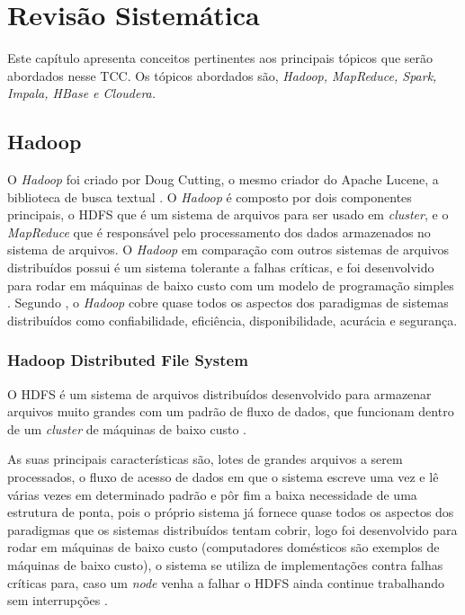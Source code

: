\chapter[Revisão Sistemática]{Revisão Sistemática}

    Este capítulo apresenta conceitos pertinentes aos principais tópicos que serão abordados
    nesse TCC. Os tópicos abordados são, \textit{Hadoop, MapReduce, Spark, Impala, HBase e
    Cloudera.}

    \section{Hadoop}

            O \textit{Hadoop} foi criado por Doug Cutting, o mesmo criador do Apache Lucene, a biblioteca de busca
            textual \cite{white2015}. O \textit{Hadoop} é composto por dois componentes principais, o HDFS que é
            um sistema de arquivos para ser usado em \textit{cluster}, e o \textit{MapReduce} que é responsável
            pelo processamento dos dados armazenados no sistema de arquivos. O \textit{Hadoop} em comparação
            com outros sistemas de arquivos distribuídos possui é um sistema tolerante a falhas críticas, e foi
            desenvolvido para rodar em máquinas de baixo custo com um modelo de programação simples
            \cite{alam2014}. Segundo , o \textit{Hadoop} cobre quase todos os aspectos dos
            paradigmas de sistemas distribuídos como confiabilidade, eficiência, disponibilidade, acurácia e segurança.

        \subsection{Hadoop Distributed File System}

            O HDFS é um sistema de arquivos distribuídos desenvolvido para armazenar arquivos muito grandes
            com um padrão de fluxo de dados, que funcionam dentro de um \textit{cluster} de máquinas de baixo
            custo \cite{white2015}.

            As suas principais características são, lotes de grandes arquivos a serem processados, o fluxo de acesso
            de dados em que o sistema escreve uma vez e lê várias vezes em determinado padrão e pôr fim a baixa
            necessidade de uma estrutura de ponta, pois o próprio sistema já fornece quase todos os aspectos dos
            paradigmas que os sistemas distribuídos tentam cobrir, logo foi desenvolvido para rodar em máquinas de
            baixo custo (computadores domésticos são exemplos de máquinas de baixo custo), o sistema se utiliza de
            implementações contra falhas críticas para, caso um \textit{node} venha a falhar o HDFS ainda continue
            trabalhando sem interrupções \cite{white2015}.

